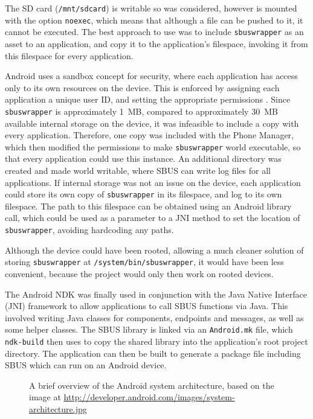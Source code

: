 \documentclass[12pt,twoside,notitlepage]{report}
\begin{document}
The SD card ({\tt /mnt/sdcard}) is writable so was considered, however is mounted with the option {\tt noexec}, which means that although a file can be pushed to it, it cannot be executed. 
The best approach to use was to include {\tt sbuswrapper} as an asset to an application, and copy it to the application's filespace, invoking it from this filespace for every application. 

Android uses a sandbox concept for security, where each application has access only to its own resources on the device. 
This is enforced by assigning each application a unique user ID, and setting the appropriate permissions \cite{enck2009understanding}. 
Since {\tt sbuswrapper} is approximately \SI{1}{MB}, compared to approximately \SI{30}{MB} available internal storage on the device, it was infeasible to include a copy with every application. 
Therefore, one copy was included with the Phone Manager, which then modified the permissions to make {\tt sbuswrapper} world executable, so that every application could use this instance. 
An additional directory was created and made world writable, where SBUS can write log files for all applications. 
If internal storage was not an issue on the device, each application could store its own copy of {\tt sbuswrapper} in its filespace, and log to its own filespace. 
The path to this filespace can be obtained using an Android library call, which could be used as a parameter to a JNI method to set the location of {\tt sbuswrapper}, avoiding hardcoding any paths. 

Although the device could have been rooted, allowing a much cleaner solution of storing {\tt sbuswrapper} at {\tt /system/bin/sbuswrapper}, it would have been less convenient, because the project would only then work on rooted devices. 


The Android NDK was finally used in conjunction with the Java Native Interface (JNI) framework to allow applications to call SBUS functions via Java. 
This involved writing Java classes for components, endpoints and messages, as well as some helper classes. 
The SBUS library is linked via an {\tt Android.mk} file, which {\tt ndk-build} then uses to copy the shared library into the application's root project directory. 
The application can then be built to generate a package file including SBUS which can run on an Android device. 
 
\begin{figure}[h]
\epsfxsize=8cm
\centerline{}
\caption[Android System Architecture]{A brief overview of the Android system architecture, based on the image at \url{http://developer.android.com/images/system-architecture.jpg}}
\label{fig:android_stack}
\end{figure}
\end{document}
